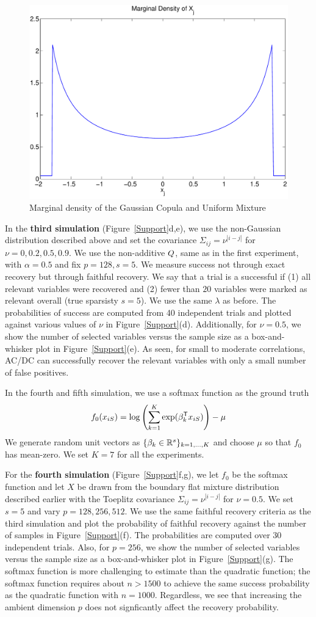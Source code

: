 \begin{figure}
\includegraphics[width=.4\textwidth]{figs/copula_marginal}
\caption{Marginal density of the Gaussian Copula and Uniform Mixture}
\label{fig:copula_marginal}
\end{figure}

In the \textbf{third simulation} (Figure~\ref{Support}d,e), we use the non-Gaussian distribution described above and set the covariance $\Sigma_{ij}=\nu^{|i-j|}$ for $\nu = 0, 0.2, 0.5, 0.9$. We use the non-additive $Q$, same as in the first experiment, with $\alpha=0.5$ and fix $p=128, s=5$. We measure success not through exact recovery but through faithful recovery. We say that a trial is a successful if (1) all relevant variables were recovered and (2) fewer than $20$ variables were marked as relevant overall (true sparsisty $s=5$). We use the same $\lambda$ as before. The probabilities of success are computed from 40 independent trials and plotted against various values of $\nu$ in Figure~\ref{Support}(d). Additionally, for $\nu = 0.5$, we show the number of selected variables versus the sample size as a box-and-whisker plot in Figure~\ref{Support}(e). As seen, for small to moderate correlations, AC/DC can successfully recover the relevant variables with only a small number of false positives. 

In the fourth and fifth simulation, we use a softmax function as the ground truth
\begin{align}
f_0(x_{iS}) = \log \left( \sum_{k=1}^K \exp( \beta_k^{\mathsf{T}} x_{iS} ) \right) - \mu
\end{align}
We generate random unit vectors as $\{\beta_k \in {\mathbb R}^s\}_{k=1,...,K}$ and choose $\mu$ so that $f_0$ has mean-zero. We set $K = 7$ for all the experiments. 

For the \textbf{fourth simulation} (Figure~\ref{Support}f,g), we let $f_0$ be the softmax function and let $X$ be drawn from the boundary flat mixture distribution described earlier with the Toeplitz covariance $\Sigma_{ij}=\nu^{|i-j|}$ for $\nu = 0.5$. We set $s=5$ and vary $p=128,256,512$. We use the same faithful recovery criteria as the third simulation and plot the probability of faithful recovery against the number of samples in Figure~\ref{Support}(f). The probabilities are computed over 30 independent trials. Also, for $p=256$, we show the number of selected variables versus the sample size as a box-and-whisker plot in Figure~\ref{Support}(g). The softmax function is more challenging to estimate than the quadratic function; the softmax function requires about $n > 1500$ to achieve the same success probability as the quadratic function with $n=1000$. Regardless, we see that increasing the ambient dimension $p$ does not signficantly affect the recovery probability.

